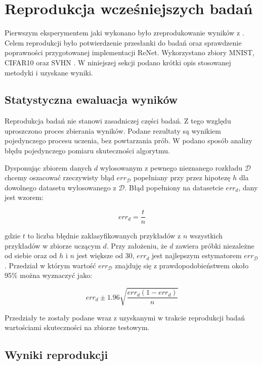 \documentclass[oneside, mag]{mgr}
\begin{document}
\section{Reprodukcja wcześniejszych badań}

Pierwszym eksperymentem jaki wykonano było zreprodukowanie wyników z \cite{DBLP:journals/corr/VisinKCMCB15}. Celem reprodukcji było potwierdzenie przesłanki do badań oraz sprawdzenie poprawności przygotowanej implementacji ReNet. Wykorzystano zbiory MNIST, CIFAR10 oraz SVHN \cite{svhn}. W niniejszej sekcji podano krótki opis stosowanej metodyki i uzyskane wyniki.

\subsection{Statystyczna ewaluacja wyników}

Reprodukcja badań nie stanowi zasadniczej części badań. Z tego względu uproszczono proces zbierania wyników. Podane rezultaty są wynikiem pojedynczego procesu uczenia, bez powtarzania prób. W \cite{tom-mitchell-machine-learning} podano sposób analizy błędu pojedynczego pomiaru skuteczności algorytmu.

Dysponując zbiorem danych $d$ wylosowanym z pewnego nieznanego rozkładu $\mathcal{D}$ chcemy oszacować rzeczywisty błąd $err_{\mathcal{D}}$ popełniany przy przez hipotezę $h$ dla dowolnego datasetu wylosowanego z $\mathcal{D}$. Błąd popełniony na datasetcie $err_d$, dany jest wzorem:

\begin{equation}
	err_d = \frac{t}{n}
\end{equation}

gdzie $t$ to liczba błędnie zaklasyfikowanych przykładów z $n$ wszystkich przykładów w zbiorze uczącym $d$.
Przy założeniu, że $d$ zawiera próbki niezależne od siebie oraz od $h$ i $n$ jest większe od 30, $err_d$ jest najlepszym estymatorem $err_{\mathcal{D}}$. Przedział w którym wartość $err_{\mathcal{D}}$ znajduję się z prawdopodobieństwem około 95\% można wyznaczyć jako:

\begin{equation}
	err_{d} \pm 1.96 \sqrt{\frac{err_{d}(1 - err_{d})}{n}} 
\end{equation}

Przedziały te zostały podane wraz z uzyskanymi w trakcie reprodukcji badań wartościami skuteczności na zbiorze testowym.

\subsection{Wyniki reprodukcji}
\end{document}
